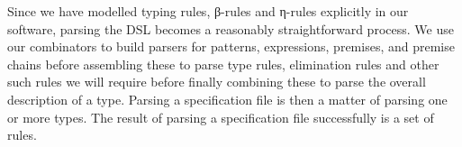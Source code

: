 {\begin{code}
\>[0]\AgdaSpace{}%
\AgdaSpace{}%
\AgdaSpace{}%
\AgdaSpace{}%
\AgdaSymbol{(}\AgdaSymbol{)}\<%
\\
\>[0]\AgdaSpace{}%
\AgdaSpace{}%
\AgdaSpace{}%
\<%
\\
\>[0]\AgdaSpace{}%
\AgdaSpace{}%
\<%
\\
\>[0]\AgdaSpace{}%
\AgdaSpace{}%
\AgdaSpace{}%
\AgdaSpace{}%
\<%
\\
\>[0]\AgdaSpace{}%
\<%
\\
\>[0]\AgdaSpace{}%
\<%
\end{code}
}

Since we have modelled typing rules, β-rules and η-rules explicitly in our
software, parsing the DSL becomes a reasonably straightforward process. We
use our combinators to build parsers for patterns, expressions, premises, and
premise chains before assembling these to parse type rules, elimination rules
and other such rules we will require before finally combining these to parse the
overall description of a type. Parsing a specification file is then a matter
of parsing one or more types. The result of parsing a specification file
successfully is a set of rules.

